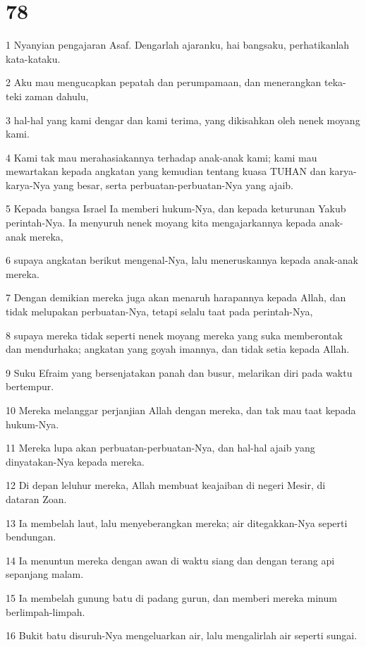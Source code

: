 \chapter{78}

\par 1 Nyanyian pengajaran Asaf. Dengarlah ajaranku, hai bangsaku, perhatikanlah kata-kataku.
\par 2 Aku mau mengucapkan pepatah dan perumpamaan, dan menerangkan teka-teki zaman dahulu,
\par 3 hal-hal yang kami dengar dan kami terima, yang dikisahkan oleh nenek moyang kami.
\par 4 Kami tak mau merahasiakannya terhadap anak-anak kami; kami mau mewartakan kepada angkatan yang kemudian tentang kuasa TUHAN dan karya-karya-Nya yang besar, serta perbuatan-perbuatan-Nya yang ajaib.
\par 5 Kepada bangsa Israel Ia memberi hukum-Nya, dan kepada keturunan Yakub perintah-Nya. Ia menyuruh nenek moyang kita mengajarkannya kepada anak-anak mereka,
\par 6 supaya angkatan berikut mengenal-Nya, lalu meneruskannya kepada anak-anak mereka.
\par 7 Dengan demikian mereka juga akan menaruh harapannya kepada Allah, dan tidak melupakan perbuatan-Nya, tetapi selalu taat pada perintah-Nya,
\par 8 supaya mereka tidak seperti nenek moyang mereka yang suka memberontak dan mendurhaka; angkatan yang goyah imannya, dan tidak setia kepada Allah.
\par 9 Suku Efraim yang bersenjatakan panah dan busur, melarikan diri pada waktu bertempur.
\par 10 Mereka melanggar perjanjian Allah dengan mereka, dan tak mau taat kepada hukum-Nya.
\par 11 Mereka lupa akan perbuatan-perbuatan-Nya, dan hal-hal ajaib yang dinyatakan-Nya kepada mereka.
\par 12 Di depan leluhur mereka, Allah membuat keajaiban di negeri Mesir, di dataran Zoan.
\par 13 Ia membelah laut, lalu menyeberangkan mereka; air ditegakkan-Nya seperti bendungan.
\par 14 Ia menuntun mereka dengan awan di waktu siang dan dengan terang api sepanjang malam.
\par 15 Ia membelah gunung batu di padang gurun, dan memberi mereka minum berlimpah-limpah.
\par 16 Bukit batu disuruh-Nya mengeluarkan air, lalu mengalirlah air seperti sungai.
